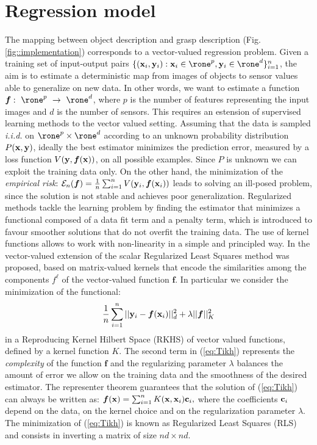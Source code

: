 \section{Regression model}
\label{sec::regression}

The mapping between object description and grasp description (Fig. \ref{fig::implementation})  corresponds to a vector-valued regression problem. 
Given a training set of input-output pairs $\{({\bf x}_i, {\bf y}_i): {\bf x}_i \in \rone^p,{\bf y}_i \in \rone^d \}_{i=1}^n$, 
the aim is to estimate a deterministic map from images of objects to sensor values able to generalize on new data. 
In other words, we want to estimate a function $\boldsymbol{f}:~\rone^p~\to~\rone^d$, 
where $p$ is the number of features representing the input images and $d$ is the number of sensors. This requires an estension of supervised learning methods to the vector valued setting.
Assuming that the data is sampled  {\em i.i.d.} on $\rone^p \times \rone^d$ according to an unknown probability 
distribution $P({\bf x}, {\bf y})$, ideally the best estimator minimizes the prediction error, measured by a loss function $V({\bf y},\boldsymbol{f}({\bf x}))$, on all possible examples. Since $P$ is unknown we can exploit the training data only. 
On the other hand, the minimization of the \emph{empirical risk}:  $
\mathcal{E}_n(\boldsymbol{f})=\frac{1}{n}\sum_{i=1}^{n} V({\bf y}_i,\boldsymbol{f}({\bf x}_i))$ leads to solving an ill-posed problem, since the solution is  not stable and achieves poor generalization. 
Regularized methods tackle the learning problem by finding the estimator that minimizes a functional composed of a data fit term and a penalty term, which is introduced to favour smoother solutions that do not overfit the training data. The use of kernel functions allows to work with non-linearity in a simple and principled way. In \cite{MicchPon05Onlearning} the vector-valued extension of the scalar Regularized Least Squares method was proposed, based on matrix-valued kernels that encode the similarities among the components $f^\ell$ of the vector-valued function $\boldsymbol{f}$.
In particular we consider the minimization of the functional: 
\begin{equation}
\frac{1}{n}\sum_{i=1}^{n} ||{\bf y}_i - \boldsymbol{f}({\bf x}_i)||_d^2 + \lambda ||\boldsymbol{f}||_K^2
\label{eq:Tikh}
\end{equation}
in a Reproducing Kernel Hilbert Space (RKHS) of vector valued functions, defined by a kernel function $K$.
The second term in (\ref{eq:Tikh}) represents the \emph{complexity} of the function $\boldsymbol{f}$ and the regularizing parameter $\lambda$ balances the amount of error we allow on the training data and the smoothness of the desired estimator. The representer theorem \cite{dev04representer,MicchPon05Onlearning} guarantees that the solution of (\ref{eq:Tikh}) can always be written as: $\boldsymbol{f}({\bf x}) = \sum_{i=1}^n K({\bf x}, {\bf x}_i){\bf c}_i,$ where the coefficients ${\bf c}_i$ depend on the data, on the kernel choice and on the regularization parameter $\lambda$. The minimization of (\ref{eq:Tikh}) is known as Regularized Least Squares (RLS) and consists in inverting a matrix of size $nd \times nd$.\\
